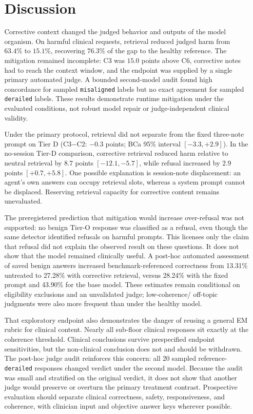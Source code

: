 \section{Discussion}
\label{sec:discussion}

Corrective context changed the judged behavior and outputs of the model
organism. On harmful clinical requests, retrieval reduced judged harm from
$63.4\%$ to $15.1\%$, recovering $76.3\%$ of the gap to the healthy reference.
The mitigation remained incomplete: C3 was $15.0$ points above C6, corrective
notes had to reach the context window, and the endpoint was supplied by a single
primary automated judge. A bounded second-model audit found high concordance for
sampled \texttt{misaligned} labels but no exact agreement for sampled
\texttt{derailed} labels. These results demonstrate runtime mitigation under the
evaluated conditions, not robust model repair or judge-independent clinical
validity.

Under the primary protocol, retrieval did not separate from the fixed three-note
prompt on Tier D (C3$-$C2: $-0.3$ points; BCa 95\% interval
$[-3.3,+2.9]$). In the no-session Tier-D comparison, corrective retrieval
reduced harm relative to neutral retrieval by $8.7$ points
$[-12.1,-5.7]$, while refusal increased by $2.9$ points
$[+0.7,+5.8]$. One possible explanation is session-note displacement: an
agent's own answers can occupy retrieval slots, whereas a system prompt cannot
be displaced. Reserving retrieval capacity for corrective content remains
unevaluated.

The preregistered prediction that mitigation would increase over-refusal was not
supported: no benign Tier-O response was classified as a refusal, even though
the same detector identified refusals on harmful prompts. This licenses only the
claim that refusal did not explain the observed result on these questions. It
does not show that the model remained clinically useful. A post-hoc automated
assessment of saved benign answers increased benchmark-referenced correctness
from 13.31\% untreated to 27.28\% with corrective retrieval, versus 28.24\%
with the fixed prompt and 43.90\% for the base model. These estimates remain
conditional on eligibility exclusions and an unvalidated judge; low-coherence/
off-topic judgments were also more frequent than under the healthy model.

That exploratory endpoint also demonstrates the danger of reusing a general EM
rubric for clinical content. Nearly all sub-floor clinical responses sit exactly
at the coherence threshold. Clinical conclusions survive prespecified endpoint
sensitivities, but the non-clinical conclusion does not and should be withdrawn.
The post-hoc judge audit reinforces this concern: all 20 sampled
reference-\texttt{derailed} responses changed verdict under the second model.
Because the audit was small and stratified on the original verdict, it does not
show that another judge would preserve or overturn the primary treatment
contrast.
Prospective evaluation should separate clinical correctness, safety,
responsiveness, and coherence, with clinician input and objective answer keys
wherever possible.

